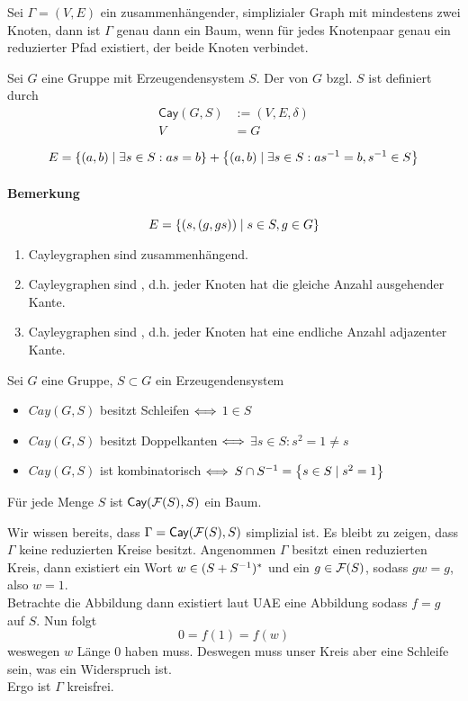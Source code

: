 \documentclass{article}
\newcommand{\tm}{\subset}
\newcommand{\Cay}[2]{\textsf{Cay}(#1,#2)}
\begin{document}
Sei $\Gamma = (V,E)$ ein zusammenhängender, simplizialer Graph mit mindestens zwei Knoten, dann ist $\Gamma$ genau dann ein Baum, wenn für jedes Knotenpaar genau ein reduzierter Pfad existiert, der beide Knoten verbindet.

Sei $G$ eine Gruppe mit Erzeugendensystem $S$. Der  von $G$ bzgl. $S$ ist definiert durch
\begin{align*}
\Cay{G}{S} & := (V,E,\delta)\\
V &= G\\
\end{align*}
\[E  = \set{(a,b)}{\exists s \in S: as = b} + \set{(a,b)}{\exists s \in S: as\i = b, s\i \in S}\]
\paragraph{Bemerkung}
\[E = \set{(s, (g, gs))}{ s\in S, g\in G } \]


\begin{enumerate}
\item Cayleygraphen sind zusammenhängend.
\item Cayleygraphen sind , d.h. jeder Knoten hat die gleiche Anzahl ausgehender Kante.
\item Cayleygraphen sind , d.h. jeder Knoten hat eine endliche Anzahl adjazenter Kante.
\end{enumerate}

\Satz{}
Sei $G$ eine Gruppe, $S \tm G$ ein Erzeugendensystem
\begin{itemize}
\item $Cay(G,S)$ besitzt Schleifen $\overset{}{\Longleftrightarrow}$ $1 \in S$
\item $Cay(G,S)$ besitzt Doppelkanten $\overset{}{\Longleftrightarrow}$ $\exists s \in S: s^2 = 1 \neq s$
\item $Cay(G,S)$ ist kombinatorisch $\overset{}{\Longleftrightarrow}$ $S\cap S\i = \set{s\in S}{s^2 = 1}$
\end{itemize}

\Satz{}
Für jede Menge $S$ ist $\Cay{\F(S)}{S}$ ein Baum.

\begin{Beweis}{}
Wir wissen bereits, dass $\Gamma = \Cay{\F(S)}{S}$ simplizial ist. Es bleibt zu zeigen, dass $\Gamma$ keine reduzierten Kreise besitzt. Angenommen $\Gamma$ besitzt einen reduzierten Kreis, dann existiert ein Wort $w \in (S + S^{-1})^*$ und ein $g \in \mathcal{F}(S)$, sodass $gw = g$, also $w = 1$.\\
Betrachte die Abbildung
dann existiert laut UAE eine Abbildung
sodass $f = g$ auf $S$. Nun folgt
\[ 0 = f(1) = f(w) \]
weswegen $w$ Länge 0 haben muss. Deswegen muss unser Kreis aber eine Schleife sein, was ein Widerspruch ist.\\
Ergo ist $\Gamma$ kreisfrei.
\end{Beweis}
\end{document}
